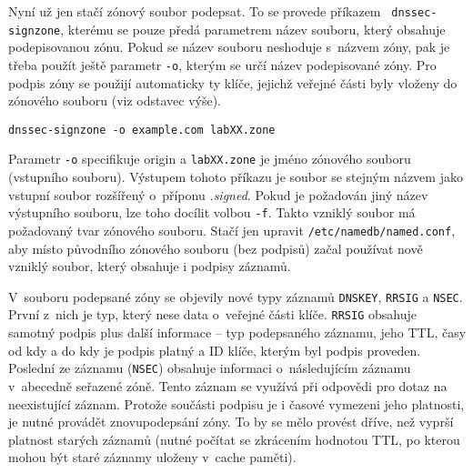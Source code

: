 Nyní už jen stačí zónový soubor podepsat. To se provede příkazem {\tt
dnssec-signzone}, kterému se pouze předá parametrem název souboru, který obsahuje podepisovanou zónu. Pokud se název souboru neshoduje s~názvem zóny, pak je třeba použít ještě parametr {\tt -o}, kterým se určí název podepisované zóny. Pro podpis zóny se použijí automaticky ty klíče, jejichž veřejné části byly vloženy do zónového souboru (viz odstavec výše).
\begin{verbatim}
dnssec-signzone -o example.com labXX.zone
\end{verbatim}
Parametr \verb|-o| specifikuje origin a \verb|labXX.zone| je jméno zónového
souboru (vstupního souboru).
Výstupem tohoto příkazu je soubor se stejným názvem jako vstupní soubor rozšířený o~příponu {\em .signed}. Pokud je požadován jiný název výstupního souboru, lze toho docílit volbou {\tt -f}. Takto vzniklý soubor má požadovaný tvar zónového souboru. Stačí jen upravit {\tt /etc/namedb/named.conf}, aby místo původního zónového souboru (bez podpisů) začal používat nově vzniklý soubor, který obsahuje i podpisy záznamů.

V~souboru podepsané zóny se objevily nové typy záznamů {\tt DNSKEY}, {\tt RRSIG} a {\tt NSEC}. První z~nich je typ, který nese data o~veřejné části klíče. {\tt RRSIG} obsahuje samotný podpis plus další informace -- typ podepsaného záznamu, jeho TTL, časy od kdy a do kdy je podpis platný a ID klíče, kterým byl podpis proveden. Poslední ze záznamu ({\tt NSEC}) obsahuje informaci o~následujícím záznamu v~abecedně seřazené zóně. Tento záznam se využívá při odpovědi pro dotaz na neexistující záznam. Protože součásti podpisu je i časové vymezeni jeho platnosti, je nutné provádět znovupodepsání zóny. To by se mělo provést dříve, než vyprší platnost starých záznamů (nutné počítat se zkrácením hodnotou TTL, po kterou mohou být staré záznamy uloženy v~cache paměti).

